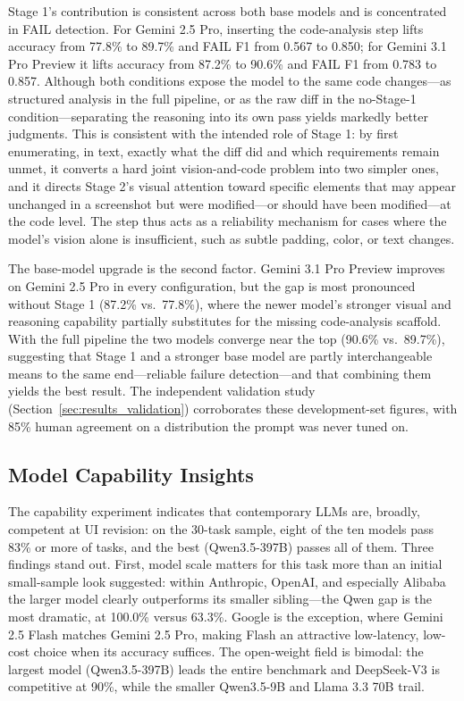 \documentclass[sigconf,nonacm]{acmart}
\begin{document}
Stage 1's contribution is consistent across both base models and is concentrated in FAIL detection. For Gemini 2.5 Pro, inserting the code-analysis step lifts accuracy from 77.8\% to 89.7\% and FAIL F1 from 0.567 to 0.850; for Gemini 3.1 Pro Preview it lifts accuracy from 87.2\% to 90.6\% and FAIL F1 from 0.783 to 0.857. Although both conditions expose the model to the same code changes—as structured analysis in the full pipeline, or as the raw diff in the no-Stage-1 condition—separating the reasoning into its own pass yields markedly better judgments. This is consistent with the intended role of Stage 1: by first enumerating, in text, exactly what the diff did and which requirements remain unmet, it converts a hard joint vision-and-code problem into two simpler ones, and it directs Stage 2's visual attention toward specific elements that may appear unchanged in a screenshot but were modified—or should have been modified—at the code level. The step thus acts as a reliability mechanism for cases where the model's vision alone is insufficient, such as subtle padding, color, or text changes.

The base-model upgrade is the second factor. Gemini 3.1 Pro Preview improves on Gemini 2.5 Pro in every configuration, but the gap is most pronounced without Stage 1 (87.2\% vs.\ 77.8\%), where the newer model's stronger visual and reasoning capability partially substitutes for the missing code-analysis scaffold. With the full pipeline the two models converge near the top (90.6\% vs.\ 89.7\%), suggesting that Stage 1 and a stronger base model are partly interchangeable means to the same end—reliable failure detection—and that combining them yields the best result. The independent validation study (Section~\ref{sec:results_validation}) corroborates these development-set figures, with 85\% human agreement on a distribution the prompt was never tuned on.

\subsection{Model Capability Insights}

The capability experiment indicates that contemporary LLMs are, broadly, competent at UI revision: on the 30-task sample, eight of the ten models pass 83\% or more of tasks, and the best (Qwen3.5-397B) passes all of them. Three findings stand out. First, model scale matters for this task more than an initial small-sample look suggested: within Anthropic, OpenAI, and especially Alibaba the larger model clearly outperforms its smaller sibling—the Qwen gap is the most dramatic, at 100.0\% versus 63.3\%. Google is the exception, where Gemini 2.5 Flash matches Gemini 2.5 Pro, making Flash an attractive low-latency, low-cost choice when its accuracy suffices. The open-weight field is bimodal: the largest model (Qwen3.5-397B) leads the entire benchmark and DeepSeek-V3 is competitive at 90\%, while the smaller Qwen3.5-9B and Llama 3.3 70B trail.
\end{document}
